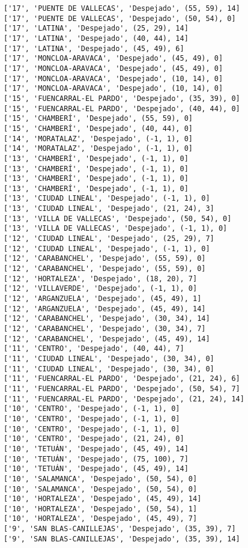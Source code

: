 \documentclass[11pt]{article}
\begin{document}
\begin{Verbatim}[commandchars=\\\{\}]
['17', 'PUENTE DE VALLECAS', 'Despejado', (55, 59), 14]
['17', 'PUENTE DE VALLECAS', 'Despejado', (50, 54), 0]
['17', 'LATINA', 'Despejado', (25, 29), 14]
['17', 'LATINA', 'Despejado', (40, 44), 14]
['17', 'LATINA', 'Despejado', (45, 49), 6]
['17', 'MONCLOA-ARAVACA', 'Despejado', (45, 49), 0]
['17', 'MONCLOA-ARAVACA', 'Despejado', (45, 49), 0]
['17', 'MONCLOA-ARAVACA', 'Despejado', (10, 14), 0]
['17', 'MONCLOA-ARAVACA', 'Despejado', (10, 14), 0]
['15', 'FUENCARRAL-EL PARDO', 'Despejado', (35, 39), 0]
['15', 'FUENCARRAL-EL PARDO', 'Despejado', (40, 44), 0]
['15', 'CHAMBERÍ', 'Despejado', (55, 59), 0]
['15', 'CHAMBERÍ', 'Despejado', (40, 44), 0]
['14', 'MORATALAZ', 'Despejado', (-1, 1), 0]
['14', 'MORATALAZ', 'Despejado', (-1, 1), 0]
['13', 'CHAMBERÍ', 'Despejado', (-1, 1), 0]
['13', 'CHAMBERÍ', 'Despejado', (-1, 1), 0]
['13', 'CHAMBERÍ', 'Despejado', (-1, 1), 0]
['13', 'CHAMBERÍ', 'Despejado', (-1, 1), 0]
['13', 'CIUDAD LINEAL', 'Despejado', (-1, 1), 0]
['13', 'CIUDAD LINEAL', 'Despejado', (21, 24), 3]
['13', 'VILLA DE VALLECAS', 'Despejado', (50, 54), 0]
['13', 'VILLA DE VALLECAS', 'Despejado', (-1, 1), 0]
['12', 'CIUDAD LINEAL', 'Despejado', (25, 29), 7]
['12', 'CIUDAD LINEAL', 'Despejado', (-1, 1), 0]
['12', 'CARABANCHEL', 'Despejado', (55, 59), 0]
['12', 'CARABANCHEL', 'Despejado', (55, 59), 0]
['12', 'HORTALEZA', 'Despejado', (18, 20), 7]
['12', 'VILLAVERDE', 'Despejado', (-1, 1), 0]
['12', 'ARGANZUELA', 'Despejado', (45, 49), 1]
['12', 'ARGANZUELA', 'Despejado', (45, 49), 14]
['12', 'CARABANCHEL', 'Despejado', (30, 34), 14]
['12', 'CARABANCHEL', 'Despejado', (30, 34), 7]
['12', 'CARABANCHEL', 'Despejado', (45, 49), 14]
['11', 'CENTRO', 'Despejado', (40, 44), 7]
['11', 'CIUDAD LINEAL', 'Despejado', (30, 34), 0]
['11', 'CIUDAD LINEAL', 'Despejado', (30, 34), 0]
['11', 'FUENCARRAL-EL PARDO', 'Despejado', (21, 24), 6]
['11', 'FUENCARRAL-EL PARDO', 'Despejado', (50, 54), 7]
['11', 'FUENCARRAL-EL PARDO', 'Despejado', (21, 24), 14]
['10', 'CENTRO', 'Despejado', (-1, 1), 0]
['10', 'CENTRO', 'Despejado', (-1, 1), 0]
['10', 'CENTRO', 'Despejado', (-1, 1), 0]
['10', 'CENTRO', 'Despejado', (21, 24), 0]
['10', 'TETUÁN', 'Despejado', (45, 49), 14]
['10', 'TETUÁN', 'Despejado', (75, 100), 7]
['10', 'TETUÁN', 'Despejado', (45, 49), 14]
['10', 'SALAMANCA', 'Despejado', (50, 54), 0]
['10', 'SALAMANCA', 'Despejado', (50, 54), 0]
['10', 'HORTALEZA', 'Despejado', (45, 49), 14]
['10', 'HORTALEZA', 'Despejado', (50, 54), 1]
['10', 'HORTALEZA', 'Despejado', (45, 49), 7]
['9', 'SAN BLAS-CANILLEJAS', 'Despejado', (35, 39), 7]
['9', 'SAN BLAS-CANILLEJAS', 'Despejado', (35, 39), 14]

\end{Verbatim}
\end{document}
